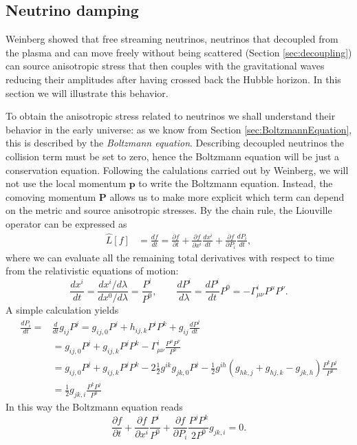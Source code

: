 \subsection{Neutrino damping}
\label{sec:neutrino_damping}
 Weinberg \cite{Weinberg_nu_dump} showed that free streaming neutrinos, neutrinos that decoupled from the plasma and can move freely without being scattered (Section \ref{sec:decoupling}) can source anisotropic stress that then couples with the gravitational waves reducing their amplitudes after having crossed back the Hubble horizon. In this section we will illustrate this behavior.

To obtain the anisotropic stress related to neutrinos we shall understand their behavior in the early universe: as we know from Section \ref{sec:BoltzmannEquation}, this is described by the \emph{Boltzmann equation}. Describing decoupled neutrinos the collision term must be set to zero, hence the Boltzmann equation will be just a conservation equation. Following the calulations carried out by Weinberg, we will not use the local momentum $\mathbf{p}$ to write the Boltzmann equation. Instead, the comoving momentum $\mathbf{P}$ allows us to make more explicit which term can depend on the metric and source anisotropic stresses. By the chain rule, the Liouville operator can be expressed as
\begin{align*}
    \hat L[f]&=\frac{df}{dt}= \frac{\partial f}{\partial t}+\frac{\partial f}{\partial x^i}\frac{dx^i}{dt}+\frac{\partial f}{\partial P_i}\frac{dP_i}{dt},
\end{align*}
where we can evaluate all the remaining total derivatives with respect to time from the relativistic equations of motion:
$$\frac{dx^i}{dt}=\frac{dx^i/d\lambda}{dx^0/d\lambda}=\frac{P^i}{P^0},\qquad \frac{dP^i}{d\lambda}=\frac{dP^i}{dt}P^0=-\Gamma^i_{\mu\nu} P^\mu P^\nu.$$
A simple calculation yields
\begin{align*}
        \frac{dP_i}{dt}=&\frac{d}{dt}g_{ij}P^j=g_{ij,0}P^j+h_{ij,k}P^iP^k+g_{ij}\frac{dP^j}{dt}\\
        &=g_{ij,0}P^j+g_{ij,k}P^jP^k-\Gamma^{i}_{\mu\nu}\frac{P^\mu P^\nu}{P^0}\\
        &=g_{ij,0}P^j+g_{ij,k}P^jP^k-2\frac{1}{2}g^{ik}g_{jk,0}P^j-\frac{1}{2}g^{ih}(g_{hk,j}+g_{hj,k}-g_{jk,h})\frac{P^kP^j}{P^0}\\
        &=\frac{1}{2}g_{jk,i}\frac{P^kP^j}{P^0}
\end{align*}
In this way the Boltzmann equation reads
\begin{equation}
    \frac{\partial f}{\partial t}+\frac{\partial f}{\partial x^i}\frac{P^i}{P^0}+\frac{\partial f}{\partial P_i}\frac{P^jP^k}{2P^0}g_{jk,i}=0. \label{eq:Boltzmann_neutrinos}
\end{equation}
